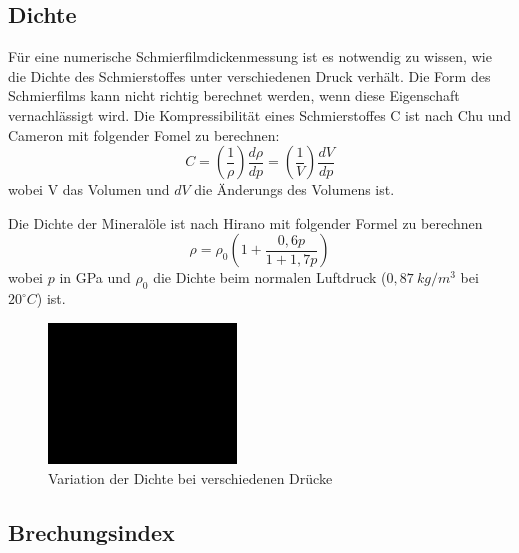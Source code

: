 \subsection*{Dichte}
\label{sub:dichte}

Für eine numerische Schmierfilmdickenmessung ist es notwendig zu wissen, wie die Dichte des Schmierstoffes unter verschiedenen Druck verhält.
Die Form des Schmierfilms kann nicht richtig berechnet werden, wenn diese Eigenschaft vernachlässigt wird.
Die Kompressibilität eines Schmierstoffes C ist nach Chu und Cameron mit folgender Fomel zu berechnen:
\begin{equation}
    \label{eq:kompressibilitaet}
    C = \left( \frac{1}{\rho} \right) \frac{d\rho}{dp} = \left( \frac{1}{V} \right) \frac{dV}{dp}
\end{equation}
%
wobei V das Volumen und $dV$ die Änderungs des Volumens ist.

Die Dichte der Mineralöle ist nach Hirano\cite{hirano} mit folgender Formel zu berechnen
\begin{equation}
    \label{eq:dichte_hirano}
    \rho = \rho_0 \left( 1 + \frac{0,6  p}{1 + 1,7  p} \right)
\end{equation}
%
wobei $p$ in GPa und $\rho_0$ die Dichte beim normalen Luftdruck ($0,87~kg/m^3$ bei $20^\circ C$) ist.
\begin{figure}[htb]
    \centering
    \includegraphics[width=5cm]{./images/blank_img.jpg}
    \caption{Variation der Dichte bei verschiedenen Drücke}
    \label{fig:variation_der_dichte_bei_verschiedenen_druecke}
\end{figure}

\subsection*{Brechungsindex}
\label{sub:brechungsindex}

